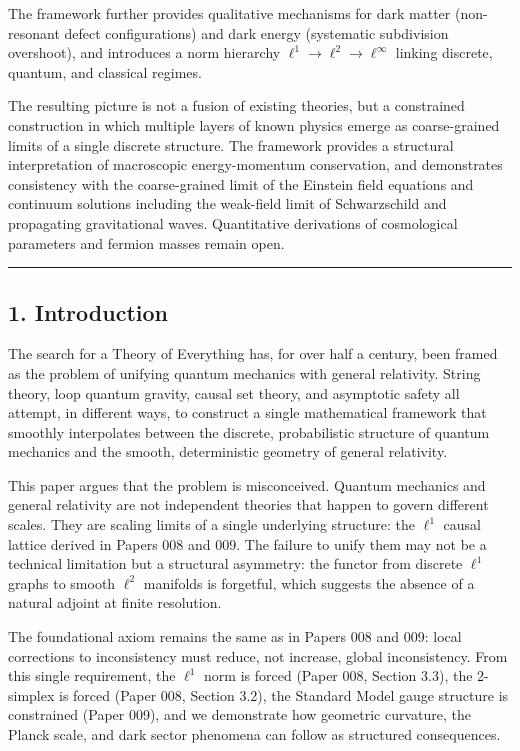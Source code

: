 \documentclass[
]{article}
\begin{document}
The framework further provides qualitative mechanisms for dark matter
(non-resonant defect configurations) and dark energy (systematic
subdivision overshoot), and introduces a norm hierarchy
\(\ell^1 \to \ell^2 \to \ell^\infty\) linking discrete, quantum, and
classical regimes.

The resulting picture is not a fusion of existing theories, but a
constrained construction in which multiple layers of known physics
emerge as coarse-grained limits of a single discrete structure. The
framework provides a structural interpretation of macroscopic
energy-momentum conservation, and demonstrates consistency with the
coarse-grained limit of the Einstein field equations and continuum
solutions including the weak-field limit of Schwarzschild and
propagating gravitational waves. Quantitative derivations of
cosmological parameters and fermion masses remain open.

\begin{center}\rule{0.5\linewidth}{0.5pt}\end{center}

\subsection{1. Introduction}\label{introduction}

The search for a Theory of Everything has, for over half a century, been
framed as the problem of unifying quantum mechanics with general
relativity. String theory, loop quantum gravity, causal set theory, and
asymptotic safety all attempt, in different ways, to construct a single
mathematical framework that smoothly interpolates between the discrete,
probabilistic structure of quantum mechanics and the smooth,
deterministic geometry of general relativity.

This paper argues that the problem is misconceived. Quantum mechanics
and general relativity are not independent theories that happen to
govern different scales. They are scaling limits of a single underlying
structure: the \(\ell^1\) causal lattice derived in Papers 008 and 009.
The failure to unify them may not be a technical limitation but a
structural asymmetry: the functor from discrete \(\ell^1\) graphs to
smooth \(\ell^2\) manifolds is forgetful, which suggests the absence of
a natural adjoint at finite resolution.

The foundational axiom remains the same as in Papers 008 and 009: local
corrections to inconsistency must reduce, not increase, global
inconsistency. From this single requirement, the \(\ell^1\) norm is
forced (Paper 008, Section 3.3), the 2-simplex is forced (Paper 008,
Section 3.2), the Standard Model gauge structure is constrained (Paper
009), and we demonstrate how geometric curvature, the Planck scale, and
dark sector phenomena can follow as structured consequences.
\end{document}
